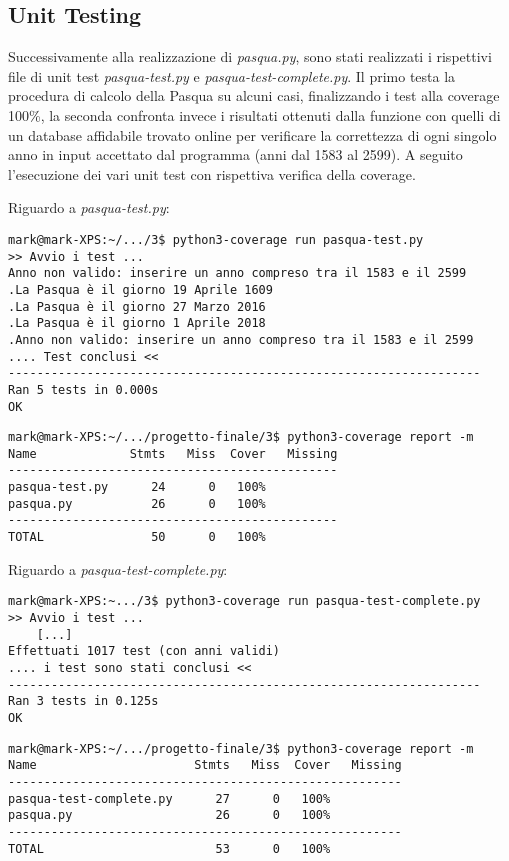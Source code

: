 \documentclass{article}
\newcommand{\filename}[1]{\textit{#1}}
\begin{document}
\subsection{Unit Testing}
Successivamente alla realizzazione di \filename{pasqua.py}, sono stati realizzati i rispettivi file di unit test \filename{pasqua-test.py} e \filename{pasqua-test-complete.py}. Il primo testa la procedura di calcolo della Pasqua su alcuni casi, finalizzando i test alla coverage 100\%, la seconda confronta invece i risultati ottenuti dalla funzione con quelli di un database affidabile trovato online per verificare la correttezza di ogni singolo anno in input accettato dal programma (anni dal 1583 al 2599).
A seguito l'esecuzione dei vari unit test con rispettiva verifica della coverage.

Riguardo a \filename{pasqua-test.py}:
\begin{verbatim}
mark@mark-XPS:~/.../3$ python3-coverage run pasqua-test.py
>> Avvio i test ...
Anno non valido: inserire un anno compreso tra il 1583 e il 2599
.La Pasqua è il giorno 19 Aprile 1609
.La Pasqua è il giorno 27 Marzo 2016
.La Pasqua è il giorno 1 Aprile 2018
.Anno non valido: inserire un anno compreso tra il 1583 e il 2599
.... Test conclusi <<
------------------------------------------------------------------
Ran 5 tests in 0.000s
OK
\end{verbatim}

\begin{verbatim}
mark@mark-XPS:~/.../progetto-finale/3$ python3-coverage report -m
Name             Stmts   Miss  Cover   Missing
----------------------------------------------
pasqua-test.py      24      0   100%
pasqua.py           26      0   100%
----------------------------------------------
TOTAL               50      0   100%
\end{verbatim}

Riguardo a \filename{pasqua-test-complete.py}:
\begin{verbatim}
mark@mark-XPS:~.../3$ python3-coverage run pasqua-test-complete.py
>> Avvio i test ...
    [...]
Effettuati 1017 test (con anni validi)
.... i test sono stati conclusi <<
------------------------------------------------------------------
Ran 3 tests in 0.125s
OK
\end{verbatim}

\begin{verbatim}
mark@mark-XPS:~/.../progetto-finale/3$ python3-coverage report -m
Name                      Stmts   Miss  Cover   Missing
-------------------------------------------------------
pasqua-test-complete.py      27      0   100%
pasqua.py                    26      0   100%
-------------------------------------------------------
TOTAL                        53      0   100%
\end{verbatim}
\end{document}
